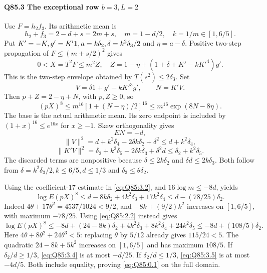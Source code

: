 \paragraph{Q85.3 The exceptional row \(b=\allowbreak 3,\allowbreak L=\allowbreak 2\)}
Use \(F=\allowbreak h_2f_3\). Its arithmetic mean is
\[
 h_2+f_3=2-d+s=2m+s,\quad m=1-d/2,\quad k=1/m\in[1,6/5].
\]
Put \(K'=\allowbreak -K,\allowbreak g'=\allowbreak K'\mathbf1,\allowbreak a=\allowbreak k\delta_2,\allowbreak \delta=\allowbreak k^2\delta_3/2\) and
\(\eta=\allowbreak a-\delta\).
Positive two-step propagation of \(F\le\allowbreak (m+s/2)^2\) gives
\[
 0<X=T^2F\le m^2 Z,
 \quad Z=1-\eta+(1+\delta+K'-kK'^4)g'.               \tag{Q85.3.1}\label{eq:Q85:3.1}
\]
This is the two-step envelope obtained by \(T(s^2)\le\allowbreak 2\delta_3\).
Set
\[
 V=\delta1+g'-kK'^3g',\qquad N=K'V.
\]
Then \(p+Z=\allowbreak 2-\eta+N\), with \(p,\allowbreak Z\ge\allowbreak 0\), so
\[
 (pX)^8\le m^{16}[1+(N-\eta)/2]^{16}
 \le m^{16}\exp(8N-8\eta).                          \tag{Q85.3.2}\label{eq:Q85:3.2}
\]
The base is the actual arithmetic mean.
Its zero endpoint is included by
\((1+x)^{16}\le\allowbreak  e^{16x}\) for \(x\ge\allowbreak -1\).
Skew orthogonality gives
\[
 EN=-d,
\]
\[
 \|V\|^2=d+k^2\delta_4-2\delta k \delta_2+\delta^2
 \le d+k^2\delta_4,
\]
\[
 \|K'V\|^2=\delta_2+k^2\delta_5-2\delta k \delta_3+\delta^2d
 \le \delta_2+k^2\delta_5.                                    \tag{Q85.3.3}\label{eq:Q85:3.3}
\]
The discarded terms are nonpositive because
\(\delta\le\allowbreak 2k\delta_2\) and \(\delta d\le\allowbreak 2k\delta_3\).
Both follow from \(\delta=\allowbreak k^2\delta_3/2,\allowbreak k\le\allowbreak 6/5,\allowbreak d\le\allowbreak 1/3\) and
\(\delta_3\le\allowbreak \theta\delta_2\).

Using the coefficient-\(17\) estimate in \eqref{eq:Q85:3.2}, and
\(16\log m\le\allowbreak -8d\), yields
\[
 \log E(pX)^8
 \le d-8k \delta_2+4k^2\delta_3+17k^2\delta_4
 \le d-(78/25)\delta_2.                                  \tag{Q85.3.4}\label{eq:Q85:3.4}
\]
Indeed \(4\theta+17\theta^2=\allowbreak 4537/1024<\allowbreak 9/2\), and
\(-8k+(9/2)k^2\) increases on \([1,\allowbreak 6/5]\), with maximum \(-78/25\).
Using \eqref{eq:Q85:2.2} instead gives
\[
 \log E(pX)^8\le
 -8d+(24-8k)\delta_2+4k^2\delta_3+8k^2\delta_4+24k^2\delta_5
 \le-8d+(108/5)\delta_2.                                 \tag{Q85.3.5}\label{eq:Q85:3.5}
\]
Here \(4\theta+8\theta^2+24\theta^3<\allowbreak 5\): replacing \(\theta\) by \(5/12\) already gives \(115/24<\allowbreak 5\).
The quadratic \(24-8k+5k^2\) increases on \([1,\allowbreak 6/5]\) and has maximum \(108/5\).
If \(\delta_2/d\ge\allowbreak 1/3\), \eqref{eq:Q85:3.4} is at most \(-d/25\).
If \(\delta_2/d\le\allowbreak 1/3\), \eqref{eq:Q85:3.5} is at most \(-4d/5\).
Both include equality, proving \eqref{eq:Q85:0.1} on the full domain.

